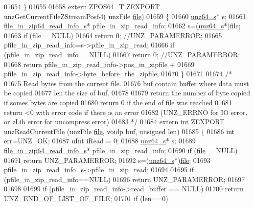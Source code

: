 \begin{DoxyCode}
01654 \}
01655 
01658 \textcolor{keyword}{extern} ZPOS64\_T ZEXPORT unzGetCurrentFileZStreamPos64( unzFile \hyperlink{structfile}{file})
01659 \{
01660     \hyperlink{structunz64__s}{unz64\_s}* s;
01661     \hyperlink{structfile__in__zip64__read__info__s}{file\_in\_zip64\_read\_info\_s}* pfile\_in\_zip\_read\_info;
01662     s=(\hyperlink{structunz64__s}{unz64\_s}*)file;
01663     \textcolor{keywordflow}{if} (file==NULL)
01664         \textcolor{keywordflow}{return} 0; \textcolor{comment}{//UNZ\_PARAMERROR;}
01665     pfile\_in\_zip\_read\_info=s->pfile\_in\_zip\_read;
01666     \textcolor{keywordflow}{if} (pfile\_in\_zip\_read\_info==NULL)
01667         \textcolor{keywordflow}{return} 0; \textcolor{comment}{//UNZ\_PARAMERROR;}
01668     \textcolor{keywordflow}{return} pfile\_in\_zip\_read\_info->pos\_in\_zipfile +
01669                          pfile\_in\_zip\_read\_info->byte\_before\_the\_zipfile;
01670 \}
01671 
01674 \textcolor{comment}{/*}
01675 \textcolor{comment}{  Read bytes from the current file.}
01676 \textcolor{comment}{  buf contain buffer where data must be copied}
01677 \textcolor{comment}{  len the size of buf.}
01678 \textcolor{comment}{}
01679 \textcolor{comment}{  return the number of byte copied if somes bytes are copied}
01680 \textcolor{comment}{  return 0 if the end of file was reached}
01681 \textcolor{comment}{  return <0 with error code if there is an error}
01682 \textcolor{comment}{    (UNZ\_ERRNO for IO error, or zLib error for uncompress error)}
01683 \textcolor{comment}{*/}
01684 \textcolor{keyword}{extern} \textcolor{keywordtype}{int} ZEXPORT unzReadCurrentFile  (unzFile \hyperlink{structfile}{file}, voidp buf, \textcolor{keywordtype}{unsigned} len)
01685 \{
01686     \textcolor{keywordtype}{int} err=UNZ\_OK;
01687     uInt iRead = 0;
01688     \hyperlink{structunz64__s}{unz64\_s}* s;
01689     \hyperlink{structfile__in__zip64__read__info__s}{file\_in\_zip64\_read\_info\_s}* pfile\_in\_zip\_read\_info;
01690     \textcolor{keywordflow}{if} (\hyperlink{structfile}{file}==NULL)
01691         \textcolor{keywordflow}{return} UNZ\_PARAMERROR;
01692     s=(\hyperlink{structunz64__s}{unz64\_s}*)\hyperlink{structfile}{file};
01693     pfile\_in\_zip\_read\_info=s->pfile\_in\_zip\_read;
01694 
01695     \textcolor{keywordflow}{if} (pfile\_in\_zip\_read\_info==NULL)
01696         \textcolor{keywordflow}{return} UNZ\_PARAMERROR;
01697 
01698 
01699     \textcolor{keywordflow}{if} (pfile\_in\_zip\_read\_info->read\_buffer == NULL)
01700         \textcolor{keywordflow}{return} UNZ\_END\_OF\_LIST\_OF\_FILE;
01701     \textcolor{keywordflow}{if} (len==0)

\end{DoxyCode}
